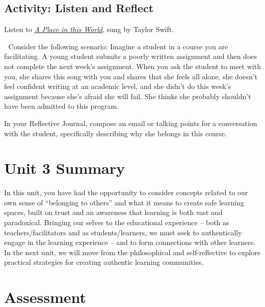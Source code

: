 \documentclass[
]{book}
\begin{document}
\hypertarget{activity-listen-and-reflect-1}{%
\subsection{Activity: Listen and Reflect}\label{activity-listen-and-reflect-1}}

\begin{video}
Listen to
\href{https://music.youtube.com/watch?v=_FNQ5qLuLjA\&list=RDAMVM_FNQ5qLuLjA}{\emph{A
Place in this World}}, sung by Taylor Swift.

💭 Consider the following scenario: Imagine a student in a course you
are facilitating. A young student submits a poorly written assignment
and then does not complete the next week's assignment. When you ask the
student to meet with you, she shares this song with you and shares that
she feels all alone, she doesn't feel confident writing at an academic
level, and she didn't do this week's assignment because she's afraid she
will fail. She thinks she probably shouldn't have been admitted to this
program.

In your Reflective Journal, compose an email or talking points for a
conversation with the student, specifically describing why she belongs
in this course.
\end{video}

\hypertarget{unit-3-summary}{%
\section*{Unit 3 Summary}\label{unit-3-summary}}

In this unit, you have had the opportunity to consider concepts related to our own sense of ``belonging to others'' and what it means to create safe learning spaces, built on trust and an awareness that learning is both vast and paradoxical. Bringing our selves to the educational experience -- both as teachers/facilitators and as students/learners, we must seek to authentically engage in the learning experience -- and to form connections with other learners. In the next unit, we will move from the philosophical and self-reflective to explore practical strategies for creating authentic learning communities.

\hypertarget{assessment-2}{%
\section*{Assessment}\label{assessment-2}}
\end{document}
